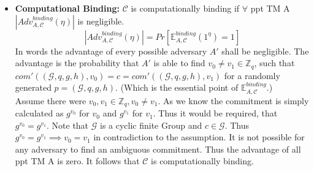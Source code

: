 \documentclass[12pt,pdftex,a4paper]{article}
\begin{document}
\begin{itemize}
\item \textbf{Computational Binding:}
$\mathcal{C}$ is computationally binding if $\forall$ ppt TM A $|Adv_{A,\mathcal{C}}^{binding}(\eta)|$ is negligible.
$$|Adv_{A,\mathcal{C}}^{binding}(\eta)| = Pr[\mathbb{E}_{A,\mathcal{C}}^{binding}(1^{\eta})=1]$$
In words the advantage of every possible adversary $A'$ shall be negligible. The advantage is the probability that $A'$ is able to find $v_0 \neq v_1 \in \mathbb{Z}_q$, such that $com'((\mathcal{G},q,g,h),v_0) = c = com'((\mathcal{G},q,g,h),v_1)$ for a randomly generated $p = (\mathcal{G},q,g,h)$. (Which is the essential point of $\mathbb{E}_{A,\mathcal{C}}^{binding}$.)\\
Assume there were $v_0, v_1 \in \mathbb{Z}_q, v_0 \neq v_1$. As we know the commitment is simply calculated as $g^{v_0}$ for $v_0$ and $g^{v_1}$ for $v_1$. Thus it would be required, that $g^{v_0} = g^{v_1}$. Note that $\mathcal{G}$ is a cyclic finite Group and $c \in \mathcal{G}$. Thus $g^{v_0} = g^{v_1} \implies v_0 = v_1$ in contradiction to the assumption. It is not possible for any adversary to find an ambiguous commitment. Thus the advantage of all ppt TM A is zero. It follows that $\mathcal{C}$ is computationally binding.
\end{itemize}
\end{document}
